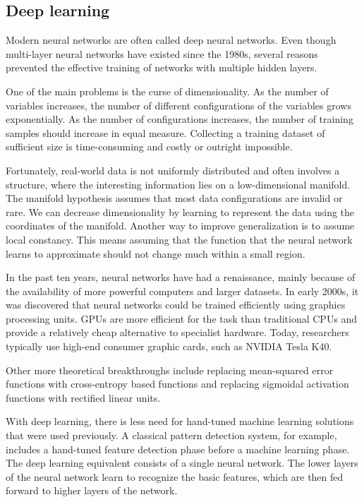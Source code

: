 \subsection{Deep learning}

Modern neural networks are often called deep neural networks. Even though multi-layer neural networks have existed since the 1980s, several reasons prevented the effective training of networks with multiple hidden layers.

One of the main problems is the curse of dimensionality. As the number of variables increases, the number of different configurations of the variables grows exponentially. As the number of configurations increases, the number of training samples should increase in equal measure. Collecting a training dataset of sufficient size is time-consuming and costly or outright impossible. 

Fortunately, real-world data is not uniformly distributed and often involves a structure, where the interesting information lies on a low-dimensional manifold. The manifold hypothesis assumes that most data configurations are invalid or rare. We can decrease dimensionality by learning to represent the data using the coordinates of the manifold. Another way to improve generalization is to assume local constancy. This means assuming that the function that the neural network learns to approximate should not change much within a small region.

In the past ten years, neural networks have had a renaissance, mainly because of the availability of more powerful computers and larger datasets. In early 2000s, it was discovered that neural networks could be trained efficiently using graphics processing units. GPUs are more efficient for the task than traditional CPUs and provide a relatively cheap alternative to specialist hardware. Today, researchers typically use high-end consumer graphic cards, such as NVIDIA Tesla K40.

Other more theoretical breakthroughs include replacing mean-squared error functions with cross-entropy based functions and replacing sigmoidal activation functions with rectified linear units.

With deep learning, there is less need for hand-tuned machine learning solutions that were used previously. A classical pattern detection system, for example, includes a hand-tuned feature detection phase before a machine learning phase. The deep learning equivalent consists of a single neural network. The lower layers of the neural network learn to recognize the basic features, which are then fed forward to higher layers of the network.

